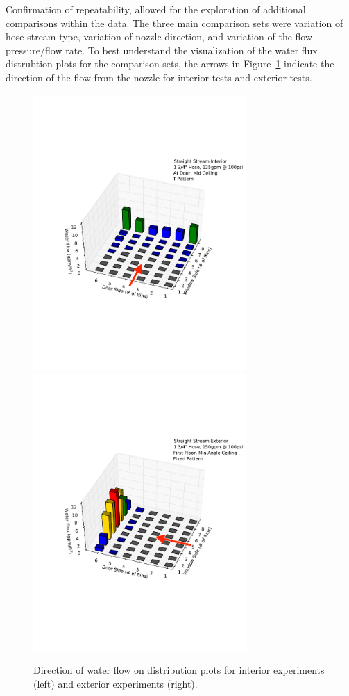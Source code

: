 \documentclass[12pt,oneside]{book}
\begin{document}
Confirmation of repeatability, allowed for the exploration of additional comparisons within the data. The three main comparison sets were variation of hose stream type, variation of nozzle direction, and variation of the flow pressure/flow rate. To best understand the visualization of the water flux distrubtion plots for the comparison sets, the arrows in Figure~\ref{fig:water_flow} indicate the direction of the flow from the nozzle for interior tests and exterior tests.

\begin{figure}[ht]
\includegraphics[width=3.2in]{Figures/Water_Distribution/Water_Flux_Interior}
\includegraphics[width=3.2in]{Figures/Water_Distribution/Water_Flux_Exterior}
\caption[Direction of Water Flow on Distribution Plots]{Direction of water flow on distribution plots for interior experiments (left) and exterior experiments (right).}
\label{fig:water_flow}
\end{figure}
\end{document}
